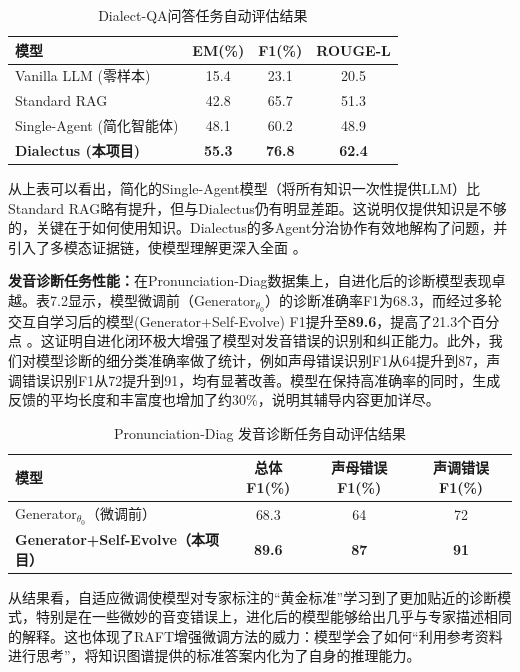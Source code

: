 \begin{table}[h]\centering
\caption{Dialect-QA问答任务自动评估结果}
\begin{tabular}{lccc}
\toprule[1pt]
模型 & EM(\%) & F1(\%) & ROUGE-L \\
\midrule[0.5pt]
Vanilla LLM (零样本) & 15.4 & 23.1 & 20.5 \\
Standard RAG & 42.8 & 65.7 & 51.3 \\
Single-Agent (简化智能体) & 48.1 & 60.2 & 48.9 \\
\textbf{Dialectus (本项目)} & \textbf{55.3} & \textbf{76.8} & \textbf{62.4} \\
\bottomrule[1pt]
\end{tabular}
\end{table}

从上表可以看出，简化的Single-Agent模型（将所有知识一次性提供LLM）比Standard RAG略有提升，但与Dialectus仍有明显差距。这说明仅提供知识是不够的，关键在于如何使用知识。Dialectus的多Agent分治协作有效地解构了问题，并引入了多模态证据链，使模型理解更深入全面 。

\textbf{发音诊断任务性能：}在Pronunciation-Diag数据集上，自进化后的诊断模型表现卓越。表7.2显示，模型微调前（Generator$_{\theta_0}$）的诊断准确率F1为68.3，而经过多轮交互自学习后的模型(Generator+Self-Evolve) F1提升至\textbf{89.6}，提高了21.3个百分点 。这证明自进化闭环极大增强了模型对发音错误的识别和纠正能力。此外，我们对模型诊断的细分类准确率做了统计，例如声母错误识别F1从64提升到87，声调错误识别F1从72提升到91，均有显著改善。模型在保持高准确率的同时，生成反馈的平均长度和丰富度也增加了约30\%，说明其辅导内容更加详尽。

\begin{table}[H]\centering
\caption{Pronunciation-Diag 发音诊断任务自动评估结果}
\begin{tabular}{lccc}
\toprule[1pt]
模型 & 总体F1(\%) & 声母错误F1(\%) & 声调错误F1(\%) \\
\midrule[0.5pt]
Generator$_{\theta_0}$（微调前） & 68.3 & 64 & 72 \\
\textbf{Generator+Self-Evolve（本项目）} & \textbf{89.6} & \textbf{87} & \textbf{91} \\
\bottomrule[1pt]
\end{tabular}
\end{table}

从结果看，自适应微调使模型对专家标注的“黄金标准”学习到了更加贴近的诊断模式，特别是在一些微妙的音变错误上，进化后的模型能够给出几乎与专家描述相同的解释。这也体现了RAFT增强微调方法的威力：模型学会了如何“利用参考资料进行思考”，将知识图谱提供的标准答案内化为了自身的推理能力。

